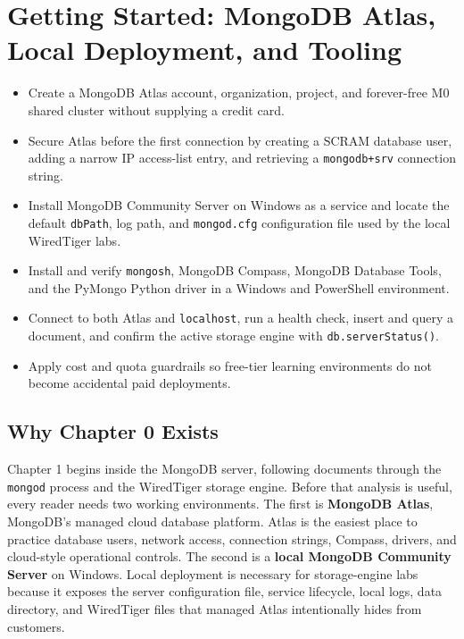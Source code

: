 \chapter{Getting Started: MongoDB Atlas, Local Deployment, and Tooling}
%


\begin{objectives}
\begin{itemize}
    \item Create a MongoDB Atlas account, organization, project, and forever-free M0 shared cluster without supplying a credit card.
    \item Secure Atlas before the first connection by creating a SCRAM database user, adding a narrow IP access-list entry, and retrieving a \texttt{mongodb+srv} connection string.
    \item Install MongoDB Community Server on Windows as a service and locate the default \texttt{dbPath}, log path, and \texttt{mongod.cfg} configuration file used by the local WiredTiger labs.
    \item Install and verify \texttt{mongosh}, MongoDB Compass, MongoDB Database Tools, and the PyMongo Python driver in a Windows and PowerShell environment.
    \item Connect to both Atlas and \texttt{localhost}, run a health check, insert and query a document, and confirm the active storage engine with \texttt{db.serverStatus()}.
    \item Apply cost and quota guardrails so free-tier learning environments do not become accidental paid deployments.
\end{itemize}
\end{objectives}

\section{Why Chapter 0 Exists}
Chapter 1 begins inside the MongoDB server, following documents through the \texttt{mongod} process and the WiredTiger storage engine. Before that analysis is useful, every reader needs two working environments. The first is \textbf{MongoDB Atlas}, MongoDB's managed cloud database platform. Atlas is the easiest place to practice database users, network access, connection strings, Compass, drivers, and cloud-style operational controls. The second is a \textbf{local MongoDB Community Server} on Windows. Local deployment is necessary for storage-engine labs because it exposes the server configuration file, service lifecycle, local logs, data directory, and WiredTiger files that managed Atlas intentionally hides from customers.


